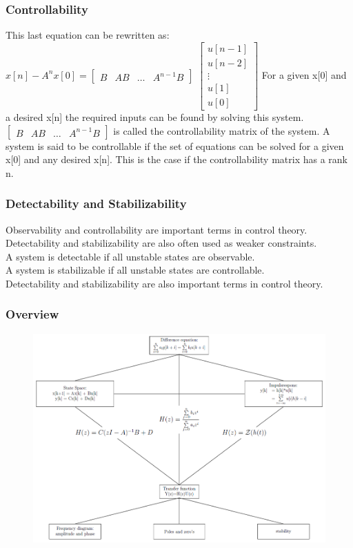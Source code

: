 \begin{frame}
	\frametitle{Controllability}
	This last equation can be rewritten as:
	$x[n] - A^{n}x[0] = \begin{bmatrix}
	B & AB & \dots & A^{n-1}B
	\end{bmatrix}$ $
	\begin{bmatrix}
	u[n-1]\\
	u[n-2]\\
	\vdots\\
	u[1]\\
	u[0]
	\end{bmatrix}
	 $	
	For a given x[0] and a desired x[n] the required inputs can be found by solving this system.
	$\begin{bmatrix}
		B & AB & \dots & A^{n-1}B
	\end{bmatrix}$ is called the controllability matrix of the system.
	A system is said to be controllable if the set of equations can be solved for a given x[0] and any desired x[n].
	This is the case if the controllability matrix has a rank n.
	
\end{frame}
\begin{frame}
	\frametitle{Detectability and Stabilizability}
	Observability and controllability are important terms in control theory.\\
	Detectability and stabilizability are also often used as weaker constraints.\\
	A system is detectable if all unstable states are observable.\\
	A system is stabilizable if all unstable states are controllable.\\
	Detectability and stabilizability are also important terms in control theory.\\
\end{frame}
\begin{frame}
	\frametitle{Overview}
	\begin{figure}
		\centering
		\includegraphics[width=0.7\linewidth]{Images/discrete_time_systems_28}
		\label{fig:discrete_time_systems_28}
	\end{figure}
\end{frame}
